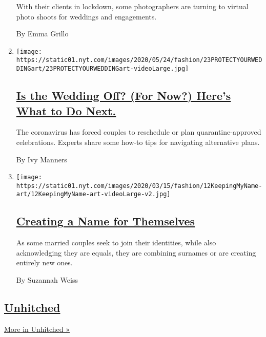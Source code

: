 \begin{enumerate}
  With their clients in lockdown, some photographers are turning to
  virtual photo shoots for weddings and engagements.

  By Emma Grillo
\item
  \texttt{[image: https://static01.nyt.com/images/2020/05/24/fashion/23PROTECTYOURWEDDINGart/23PROTECTYOURWEDDINGart-videoLarge.jpg]}

  \hypertarget{is-the-wedding-off-for-now-heres-what-to-do-next}{%
  \subsection{\texorpdfstring{\href{/2020/05/23/fashion/weddings/is-the-wedding-off-for-now-heres-what-to-do-next.html}{Is
  the Wedding Off? (For Now?) Here's What to Do
  Next.}}{Is the Wedding Off? (For Now?) Here's What to Do Next.}}\label{is-the-wedding-off-for-now-heres-what-to-do-next}}

  The coronavirus has forced couples to reschedule or plan
  quarantine-approved celebrations. Experts share some how-to tips for
  navigating alternative plans.

  By Ivy Manners
\item
  \texttt{[image: https://static01.nyt.com/images/2020/03/15/fashion/12KeepingMyName-art/12KeepingMyName-art-videoLarge-v2.jpg]}

  \hypertarget{creating-a-name-for-themselves}{%
  \subsection{\texorpdfstring{\href{/2020/03/11/fashion/weddings/name-change-after-marriage-not-always-easy.html}{Creating
  a Name for
  Themselves}}{Creating a Name for Themselves}}\label{creating-a-name-for-themselves}}

  As some married couples seek to join their identities, while also
  acknowledging they are equals, they are combining surnames or are
  creating entirely new ones.

  By Suzannah Weiss
\end{enumerate}

\hypertarget{unhitched}{%
\subsection{\texorpdfstring{\href{/column/unhitched}{Unhitched}}{Unhitched}}\label{unhitched}}

\href{/column/unhitched}{More in Unhitched »}

